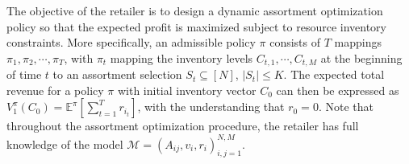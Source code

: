 \documentclass[opre]{informs3aa}
\newcommand{\Authornote}[2]{{\small\textcolor{DSgray}{\sf$<<<${  #1: #2
			}$>>>$}}}
\newcommand{\xnote}[1]{{\Authornote{Xi}{#1}}}
\begin{document}
The objective of the retailer is to design a dynamic assortment optimization policy so that the expected profit is maximized subject to resource inventory constraints.
More specifically, an admissible policy $\pi$ consists of $T$ mappings $\pi_1,\pi_2,\cdots,\pi_T$,
with $\pi_t$ mapping the inventory levels $C_{t,1},\cdots,C_{t,M}$ at the beginning of time $t$ to an assortment selection $S_t\subseteq[N]$, $|S_t|\leq K$.
The expected total revenue for a policy $\pi$ with initial inventory vector $C_0$
can then be expressed as $V_1^{\pi}(C_0)=\mathbb E^\pi[\sum_{t=1}^T r_{i_t}]$, with the understanding that $r_0=0$.
Note that throughout the assortment optimization procedure, the retailer has full knowledge of the model $\mathcal M=(A_{ij},v_i,r_i)_{i,j=1}^{N,M}$.

{
}
\end{document}
